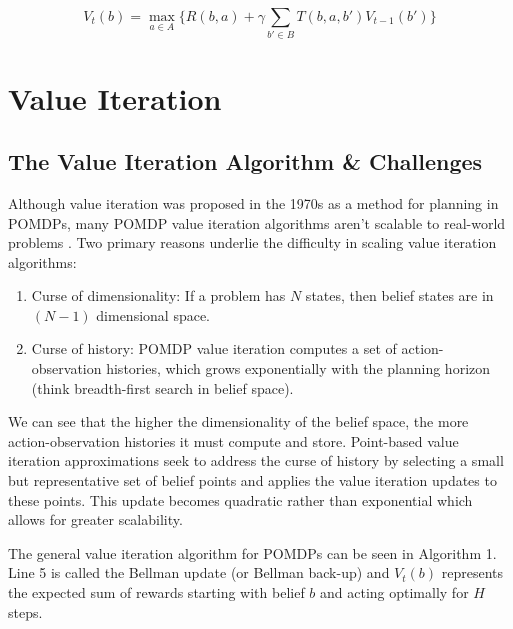 \documentclass[12pt]{elsarticle}
\begin{document}
\begin{equation}
\label{eqn:bayes_b}
V_{t}(b) = \max_{a \in A} \{R(b,a) + \gamma \sum_{b' \in B} T(b,a,b')V_{t-1}(b') \}
\end{equation}



\section{Value Iteration}
\label{value_iter}
\subsection{The Value Iteration Algorithm \& Challenges}
Although value iteration was proposed in the 1970s as a method for planning in POMDPs, many POMDP value iteration algorithms aren't scalable to real-world problems \cite{pineau2003point}. Two primary reasons underlie the difficulty in scaling value iteration algorithms:
\begin{enumerate}
    \item Curse of dimensionality: If a problem has $N$ states, then belief states are in $(N-1)$ dimensional space.
    \item Curse of history: POMDP value iteration computes a set of action-observation histories, which grows exponentially with the planning horizon (think breadth-first search in belief space).  
\end{enumerate}
We can see that the higher the dimensionality of the belief space, the more action-observation histories it must compute and store. Point-based value iteration approximations seek to address the curse of history by selecting a small but representative set of belief points and applies the value iteration updates to these points. This update becomes quadratic rather than exponential which allows for greater scalability. 

The general value iteration algorithm for POMDPs can be seen in Algorithm 1. Line 5 is called the Bellman update (or Bellman back-up) and $V_{t}(b)$ represents the expected sum of rewards starting with belief $b$ and acting optimally for $H$ steps. 
\end{document}
